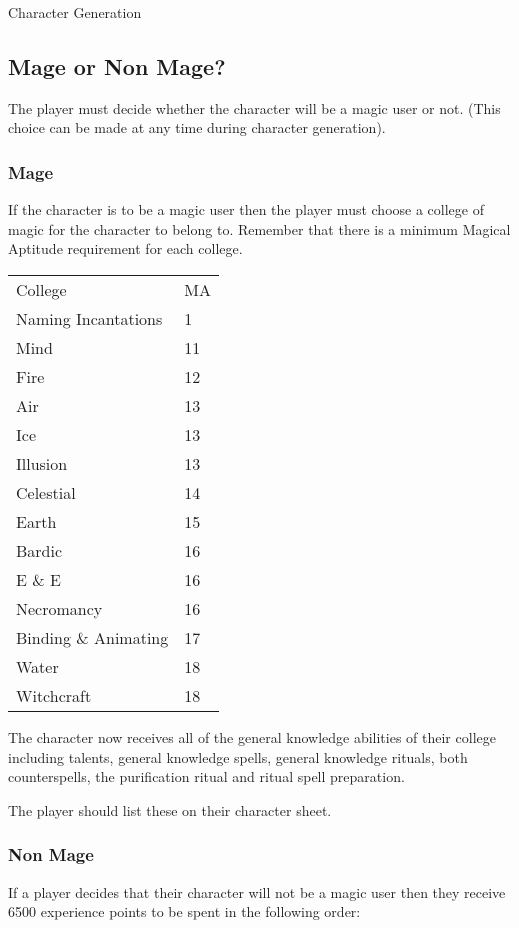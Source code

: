 \begin{Chapter}{Character Generation}
\subsection{Mage or Non Mage?}

The player must decide whether the character will be a magic user or
not. (This choice can be made at any time during character
generation).

\subsubsection{Mage}

If the character is to be a magic user then the player must choose a
college of magic for the character to belong to.  Remember that there
is a minimum Magical Aptitude requirement for each college.


\begin{tabularx}{\columnwidth}{XX}
College			& MA \\
Naming Incantations	& 1 \\
Mind			& 11 \\
Fire			& 12 \\
Air			& 13 \\
Ice			& 13 \\
Illusion		& 13 \\
Celestial		& 14 \\
Earth			& 15 \\
Bardic			& 16 \\
E \& E			& 16 \\
Necromancy		& 16 \\
Binding \& Animating	& 17 \\
Water			& 18 \\
Witchcraft		& 18 \\
\end{tabularx}

The character now receives all of the general knowledge abilities of
their college including talents, general knowledge spells, general
knowledge rituals, both counterspells, the purification ritual and
ritual spell preparation.

The player should list these on their character sheet.

\subsubsection{Non Mage}

If a player decides that their character will not be a magic user then
they receive 6500 experience points to be spent in the following
order:


\end{Chapter}
